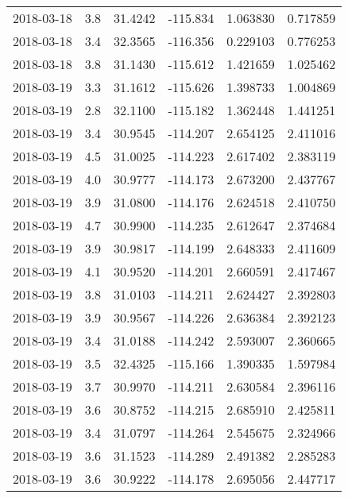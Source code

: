 \begin{tabular}{lrrrrr}
2018-03-18 &       3.8 &  31.4242 &  -115.834 &         1.063830 &         0.717859 \\
2018-03-18 &       3.4 &  32.3565 &  -116.356 &         0.229103 &         0.776253 \\
2018-03-18 &       3.8 &  31.1430 &  -115.612 &         1.421659 &         1.025462 \\
2018-03-19 &       3.3 &  31.1612 &  -115.626 &         1.398733 &         1.004869 \\
2018-03-19 &       2.8 &  32.1100 &  -115.182 &         1.362448 &         1.441251 \\
2018-03-19 &       3.4 &  30.9545 &  -114.207 &         2.654125 &         2.411016 \\
2018-03-19 &       4.5 &  31.0025 &  -114.223 &         2.617402 &         2.383119 \\
2018-03-19 &       4.0 &  30.9777 &  -114.173 &         2.673200 &         2.437767 \\
2018-03-19 &       3.9 &  31.0800 &  -114.176 &         2.624518 &         2.410750 \\
2018-03-19 &       4.7 &  30.9900 &  -114.235 &         2.612647 &         2.374684 \\
2018-03-19 &       3.9 &  30.9817 &  -114.199 &         2.648333 &         2.411609 \\
2018-03-19 &       4.1 &  30.9520 &  -114.201 &         2.660591 &         2.417467 \\
2018-03-19 &       3.8 &  31.0103 &  -114.211 &         2.624427 &         2.392803 \\
2018-03-19 &       3.9 &  30.9567 &  -114.226 &         2.636384 &         2.392123 \\
2018-03-19 &       3.4 &  31.0188 &  -114.242 &         2.593007 &         2.360665 \\
2018-03-19 &       3.5 &  32.4325 &  -115.166 &         1.390335 &         1.597984 \\
2018-03-19 &       3.7 &  30.9970 &  -114.211 &         2.630584 &         2.396116 \\
2018-03-19 &       3.6 &  30.8752 &  -114.215 &         2.685910 &         2.425811 \\
2018-03-19 &       3.4 &  31.0797 &  -114.264 &         2.545675 &         2.324966 \\
2018-03-19 &       3.6 &  31.1523 &  -114.289 &         2.491382 &         2.285283 \\
2018-03-19 &       3.6 &  30.9222 &  -114.178 &         2.695056 &         2.447717 \\

\end{tabular}

